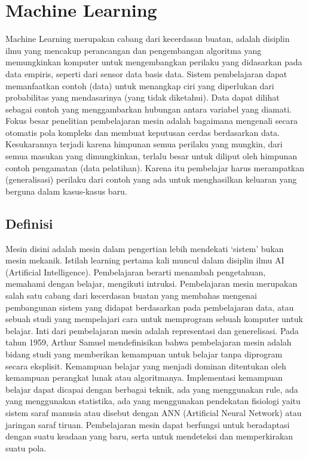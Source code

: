 \section{Machine Learning}
 Machine Learning merupakan cabang dari kecerdasan buatan, adalah disiplin ilmu yang mencakup perancangan dan pengembangan algoritma yang memungkinkan komputer untuk mengembangkan perilaku yang didasarkan pada data empiris, seperti dari sensor data basis data. Sistem pembelajaran dapat memanfaatkan contoh (data) untuk menangkap ciri yang diperlukan dari probabilitas yang mendasarinya (yang tidak diketahui). Data dapat dilihat sebagai contoh yang menggambarkan hubungan antara variabel yang diamati. Fokus besar penelitian pembelajaran mesin adalah bagaimana mengenali secara otomatis pola kompleks dan membuat keputusan cerdas berdasarkan data. Kesukarannya terjadi karena himpunan semua perilaku yang mungkin, dari semua masukan yang dimungkinkan, terlalu besar untuk diliput oleh himpunan contoh pengamatan (data pelatihan). Karena itu pembelajar harus merampatkan (generalisasi) perilaku dari contoh yang ada untuk menghasilkan keluaran yang berguna dalam kasus-kasus baru.

\subsection{Definisi}
 Mesin disini adalah mesin dalam pengertian lebih mendekati ‘sistem’ bukan mesin mekanik. Istilah learning pertama kali muncul dalam disiplin ilmu AI (Artificial Intelligence). Pembelajaran berarti menambah pengetahuan, memahami dengan belajar, mengikuti intruksi. Pembelajaran mesin merupakan salah satu cabang dari kecerdasan buatan yang membahas mengenai pembangunan sistem yang didapat berdasarkan pada pembelajaran data, atau sebuah studi yang mempelajari cara untuk memprogram sebuah komputer untuk belajar. Inti dari pembelajaran mesin adalah representasi dan generelisasi. Pada tahun 1959, Arthur Samuel mendefinisikan bahwa pembelajaran mesin adalah bidang studi yang memberikan kemampuan untuk belajar tanpa diprogram secara eksplisit. Kemampuan belajar yang menjadi dominan ditentukan oleh kemampuan perangkat lunak atau algoritmanya. Implementasi kemampuan belajar dapat dicapai dengan berbagai teknik, ada yang menggunakan rule, ada yang menggunakan statistika, ada yang menggunakan pendekatan fisiologi yaitu sistem saraf manusia atau disebut dengan ANN (Artificial Neural Network) atau jaringan saraf tiruan. Pembelajaran mesin dapat berfungsi untuk beradaptasi dengan suatu keadaan yang baru, serta untuk mendeteksi dan memperkirakan suatu pola.

